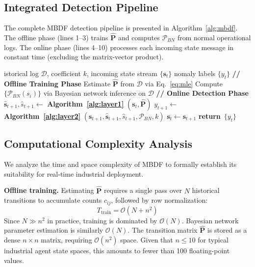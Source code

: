 \documentclass[manuscript,screen,review]{acmart}
\providecommand{\REQUIRE}[1]{\Require{#1}}
\providecommand{\ENSURE}[1]{\Ensure{#1}}
\providecommand{\STATE}{\State}
\providecommand{\FOR}{\For}
\providecommand{\ENDFOR}{\EndFor}
\providecommand{\RETURN}{\State\textbf{return}~}
\begin{document}
\subsection{Integrated Detection Pipeline}
\label{subsec:pipeline}

The complete MBDF detection pipeline is presented in
Algorithm~\ref{alg:mbdf}. The offline phase (lines 1--3)
trains $\hat{\mathbf{P}}$ and computes $\mathcal{P}_{BN}$
from normal operational logs. The online phase (lines 4--10)
processes each incoming state message in constant time
(excluding the matrix-vector product).

\begin{algorithm}[!t]
\caption{MBDF: Complete Detection Pipeline}
\label{alg:mbdf}
\begin{algorithmic}[1]
\REQUIRE Historical log $\mathcal{D}$, coefficient $k$,
         incoming state stream $\{\mathbf{s}_t\}$
\ENSURE  Anomaly labels $\{y_t\}$
\STATE \textbf{// Offline Training Phase}
\STATE Estimate $\hat{\mathbf{P}}$ from $\mathcal{D}$
       via Eq.~\eqref{eq:mle}
\STATE Compute $\{\mathcal{P}_{BN}(s_i)\}$ via
       Bayesian network inference on $\mathcal{D}$
\STATE \textbf{// Online Detection Phase}
\FOR{each incoming observation $\mathbf{s}_{t+1}$}
  \STATE $\hat{\mathbf{s}}_{t+1}, \hat{s}_{t+1}
         \leftarrow$ \textbf{Algorithm~\ref{alg:layer1}}
         $(\mathbf{s}_t, \hat{\mathbf{P}})$
  \STATE $y_{t+1} \leftarrow$ \textbf{Algorithm~\ref{alg:layer2}}
         $(\mathbf{s}_{t+1}, \hat{\mathbf{s}}_{t+1},
         \hat{s}_{t+1}, \mathcal{P}_{BN}, k)$
  \STATE $\mathbf{s}_t \leftarrow \mathbf{s}_{t+1}$
\ENDFOR
\RETURN $\{y_t\}$
\end{algorithmic}
\end{algorithm}

\subsection{Computational Complexity Analysis}
\label{subsec:complexity}

We analyze the time and space complexity of MBDF to formally
establish its suitability for real-time industrial deployment.

\textbf{Offline training.}
Estimating $\hat{\mathbf{P}}$ requires a single pass over
$N$ historical transitions to accumulate counts $c_{ij}$,
followed by row normalization:
\begin{equation}
  T_{\text{train}} = \mathcal{O}(N + n^2)
  \label{eq:train_complexity}
\end{equation}
Since $N \gg n^2$ in practice, training is dominated by
$\mathcal{O}(N)$. Bayesian network parameter estimation
is similarly $\mathcal{O}(N)$. The transition matrix
$\hat{\mathbf{P}}$ is stored as a dense $n \times n$
matrix, requiring $\mathcal{O}(n^2)$ space. Given that
$n \leq 10$ for typical industrial agent state spaces,
this amounts to fewer than 100 floating-point values.
\end{document}
